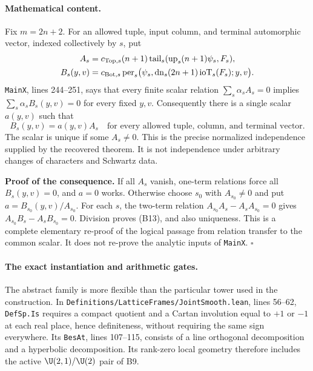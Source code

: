 \paragraph{Mathematical content.}
Fix $m=2n+2$. For an allowed tuple, input column, and terminal automorphic vector, indexed collectively by $s$, put
\begin{align*}
 A_s&=c_{{\rm Top},s}(n+1)
      \operatorname{tail}_s(\operatorname{up}_s(n+1)\psi_s,F_s),\\
 B_s(y,v)&=c_{{\rm Bot},s}
      \operatorname{per}_s\bigl(\psi_s,
       \operatorname{dn}_s(2n+1)\operatorname{ioT}_s(F_s);y,v\bigr).
\end{align*}
\texttt{MainX}, lines 244--251, says that every finite scalar relation
$\sum_s\alpha_s A_s=0$ implies
$\sum_s\alpha_s B_s(y,v)=0$ for every fixed $y,v$.
Consequently there is a single scalar $a(y,v)$ such that
\[
 B_s(y,v)=a(y,v)A_s
 \quad\text{for every allowed tuple, column, and terminal vector.}
 \tag{B13}
\]
The scalar is unique if some $A_s\ne0$. This is the precise normalized independence supplied by the recovered theorem. It is not independence under arbitrary changes of characters and Schwartz data.

\textbf{Proof of the consequence.} If all $A_s$ vanish, one-term relations force all $B_s(y,v)=0$, and $a=0$ works. Otherwise choose $s_0$ with $A_{s_0}\ne0$ and put $a=B_{s_0}(y,v)/A_{s_0}$. For each $s$, the two-term relation
$A_{s_0}A_s-A_sA_{s_0}=0$ gives
$A_{s_0}B_s-A_sB_{s_0}=0$. Division proves (B13), and also uniqueness. This is a complete elementary re-proof of the logical passage from relation transfer to the common scalar. It does not re-prove the analytic inputs of \texttt{MainX}. \hfill$\square$

\paragraph{The exact instantiation and arithmetic gates.}
The abstract family is more flexible than the particular tower used in the construction. In \texttt{Definitions/\allowbreak{}LatticeFrames/\allowbreak{}JointSmooth.lean}, lines 56--62, \texttt{DefSp.Is} requires a compact quotient and a Cartan involution equal to $+1$ or $-1$ at each real place, hence definiteness, without requiring the same sign everywhere. Its \texttt{BesAt}, lines 107--115, consists of a line orthogonal decomposition and a hyperbolic decomposition. Its rank-zero local geometry therefore includes the active $\U(2,1)/\U(2)$ pair of B9.

